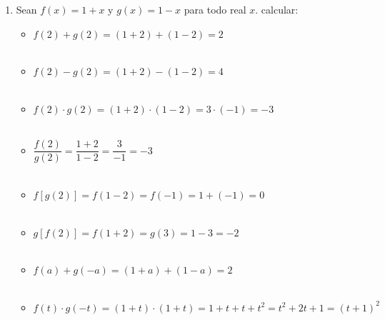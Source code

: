 \begin{enumerate}
        \item Sean $f(x)= 1+x$ \; y \; $g(x)=1-x$ para todo real $x$. calcular:
            \begin{itemize}
                \item $f(2)+g(2) = (1+2) + (1-2) = 2$\\\\
                \item $f(2)-g(2) = (1+2) - (1-2) = 4$\\\\
                \item $f(2)\cdot g(2) = (1+2) \cdot (1-2) = 3 \cdot (-1) = -3$\\\\
                \item $\dfrac{f(2)}{g(2)}= \dfrac{1+2}{1-2} = \dfrac{3}{-1} = -3$\\\\
                \item $f\left[ g(2)\right] = f(1-2) = f(-1) = 1+(-1)= 0$\\\\
                \item $g\left[ f(2)\right] = f(1+2) = g(3) = 1 - 3 = -2$\\\\
                \item $f(a) + g(-a) = (1+a) + (1 - a) = 2$\\\\
                \item $f(t)\cdot g(-t) = (1+t) \cdot (1+t) = 1 + t + t + t^2 = t^2 +2t + 1 = (t+1)^2$\\\\
            \end{itemize}
        

\end{enumerate}
